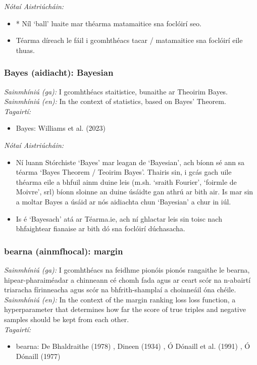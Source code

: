  \noindent \textit{Nótaí Aistriúcháin:}
\begin{itemize}
	\item * Níl `ball' luaite mar théarma matamaitice sna foclóirí seo.
	\item Téarma díreach le fáil i gcomhthéacs tacar / matamaitice sna foclóirí eile thuas.
\end{itemize}


\subsubsection*{Bayes (aidiacht): Bayesian}
 \noindent \textit{Sainmhíniú (ga):} I gcomhthéacs staitistice, bunaithe ar Theoirim Bayes.
\\
 \noindent \textit{Sainmhíniú (en):} In the context of statistics, based on Bayes' Theorem.
\\
 \noindent \textit{Tagairtí:}
\begin{itemize}
	\item Bayes: Williams et al. (2023) \cite{storchiste}
\end{itemize}

 \noindent \textit{Nótaí Aistriúcháin:}
\begin{itemize}
	\item Ní luann Stórchiste `Bayes' mar leagan de `Bayesian', ach bíonn sé ann sa téarma `Bayes Theorem / Teoirim Bayes'. Thairis sin, i gcás gach uile théarma eile a bhfuil ainm duine leis (m.sh. `sraith Fourier', `foirmle de Moivre', srl) bíonn sloinne an duine úsáidte gan athrú ar bith air. Is mar sin a moltar Bayes a úsáid ar nós aidiachta chun `Bayesian' a chur in iúl.
	\item Is é `Bayesach' atá ar Téarma.ie, ach ní ghlactar leis sin toisc nach bhfaightear fianaise ar bith dó sna foclóirí dúchasacha.
\end{itemize}


\subsubsection*{bearna (ainmfhocal): margin}
 \noindent \textit{Sainmhíniú (ga):} I gcomhthéacs na feidhme pionóis pionós rangaithe le bearna, hipear-pharaiméadar a chinneann cé chomh fada agus ar ceart scór na n-abairtí triaracha fírinneacha agus scór na bhfrith-shamplaí a choinneáil óna chéile.
\\
 \noindent \textit{Sainmhíniú (en):} In the context of the margin ranking loss loss function, a hyperparameter that determines how far the score of true triples and negative samples should be kept from each other.
\\
 \noindent \textit{Tagairtí:}
\begin{itemize}
	\item bearna: De Bhaldraithe (1978) \cite{de-bhaldraithe}, Dineen (1934) \cite{dineen}, Ó Dónaill et al. (1991) \cite{focloir-beag}, Ó Dónaill (1977) \cite{odonaill}
\end{itemize}

